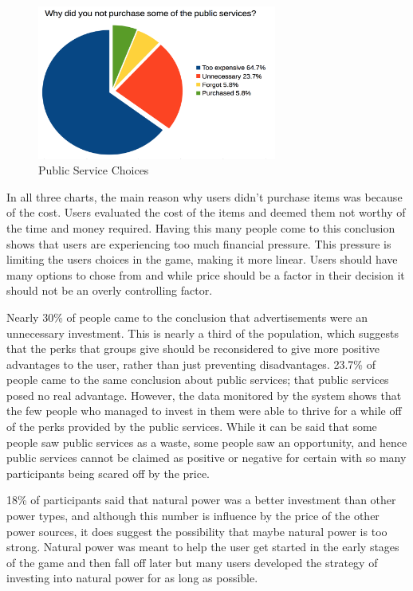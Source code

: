 \documentclass[msc,oneside]{ubcthesis}%
\begin{document}
\begin{figure}[hbt]
  \begin{center}
    \includegraphics[width=0.7\textwidth]{survey_pics/numeric/public_service}
    \caption[Public Service Choices]{Public Service Choices}\label{publicServices}
  \end{center}
\end{figure}
\newpage


In all three charts, the main reason why users didn't purchase items was because of the cost. Users evaluated the cost of the items and deemed them not worthy of the time and money required. Having this many people come to this conclusion shows that users are experiencing too much financial pressure. This pressure is limiting the users choices in the game, making it more linear. Users should have many options to chose from and while price should be a factor in their decision it should not be an overly controlling factor.

Nearly 30\% of people came to the conclusion that advertisements were an unnecessary investment. This is nearly a third of the population, which suggests that the perks that groups give should be reconsidered to give more positive advantages to the user, rather than just preventing disadvantages. 23.7\% of people came to the same conclusion about public services; that public services posed no real advantage. However, the data monitored by the system shows that the few people who managed to invest in them were able to thrive for a while off of the perks provided by the public services. While it can be said that some people saw public services as a waste, some people saw an opportunity, and hence public services cannot be claimed as positive or negative for certain with so many participants being scared off by the price. 

18\% of participants said that natural power was a better investment than other power types, and although this number is influence by the price of the other power sources, it does suggest the possibility that maybe natural power is too strong. Natural power was meant to help the user get started in the early stages of the game and then fall off later but many users developed the strategy of investing into natural power for as long as possible. 
\end{document}
